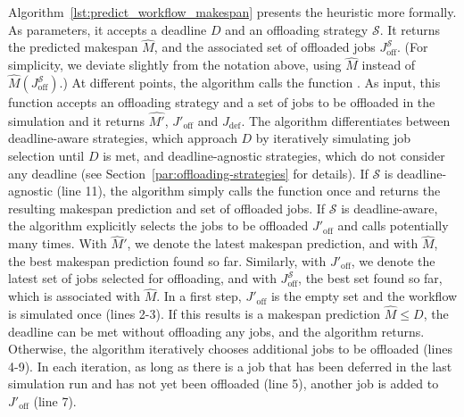 Algorithm~\ref{lst:predict_workflow_makespan} presents the heuristic more formally.
As parameters, it accepts a deadline $D$ and an offloading strategy $\mathcal{S}$.
It returns the predicted makespan $\hat{M}$, and the associated set of offloaded jobs $J^{\mathcal{S}}_\text{off}$. (For simplicity, we deviate slightly from the notation above, using $\hat{M}$ instead of $\hat{M}(J^{\mathcal{S}}_\text{off})$.) At different points, the algorithm calls the function . As input, this function accepts an offloading strategy and a set of jobs to be offloaded in the simulation and it returns $\hat{M'}$, $J'_\text{off}$ and $J_{\text{def}}$. 
The algorithm differentiates between deadline-aware strategies, which approach $D$ by iteratively simulating job selection until $D$ is met, and deadline-agnostic strategies, which do not consider any deadline (see Section~\ref{par:offloading-strategies} for details).
If $\mathcal{S}$ is deadline-agnostic (line 11), the algorithm simply calls the  function once and returns the resulting makespan prediction and set of offloaded jobs.
If $\mathcal{S}$ is deadline-aware, the algorithm explicitly selects the jobs to be offloaded $J'_\text{off}$ and calls  potentially many times.
With $\hat{M}'$, we denote the latest makespan prediction, and with $\hat{M}$, the best makespan prediction found so far.
Similarly, with $J'_\text{off}$, we denote the latest set of jobs selected for offloading, and with $J^{\mathcal{S}}_\text{off}$, the best set found so far, which is associated with $\hat{M}$.
In a first step, $J'_\text{off}$ is the empty set and the workflow is simulated once (lines 2-3).
If this results is a makespan prediction $\hat{M} \leq D$, the deadline can be met without offloading any jobs, and the algorithm returns.
Otherwise, the algorithm iteratively chooses additional jobs to be offloaded (lines 4-9).
In each iteration, as long as there is a job that has been deferred in the last simulation run and has not yet been offloaded (line 5), another job is added to $J'_\text{off}$ (line 7).
